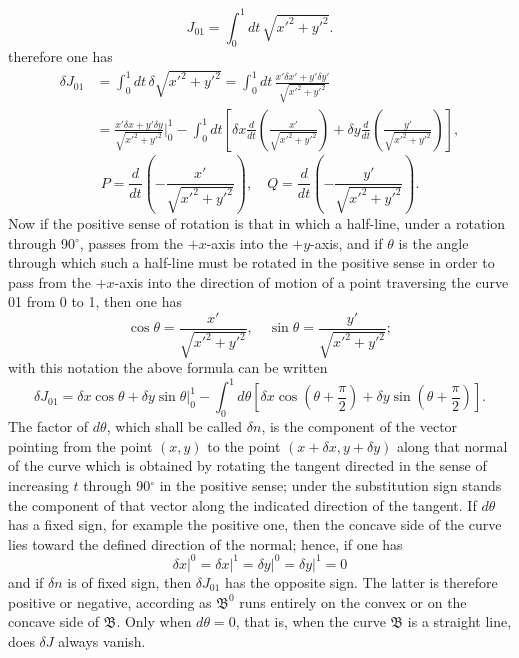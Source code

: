 \documentclass[11pt,a4paper,leqno]{article}
\begin{document}
\[
J_{01}=\int_0^1dt\,\sqrt{x'^2+y'^2}.
\]
therefore one has
\[
\begin{aligned}
\delta J_{01}
&=\int_0^1dt\,\delta\sqrt{x'^2+y'^2}
 =\int_0^1dt\,\frac{x'\delta x'+y'\delta y'}{\sqrt{x'^2+y'^2}}\\
&=\frac{x'\delta x+y'\delta y}{\sqrt{x'^2+y'^2}}\bigg|_0^1
-\int_0^1dt\left[\delta x\frac{d}{dt}\left(\frac{x'}{\sqrt{x'^2+y'^2}}\right)+\delta y\frac{d}{dt}\left(\frac{y'}{\sqrt{x'^2+y'^2}}\right)\right],
\end{aligned}
\]
\[
P=\frac{d}{dt}\left(-\frac{x'}{\sqrt{x'^2+y'^2}}\right),\quad
Q=\frac{d}{dt}\left(-\frac{y'}{\sqrt{x'^2+y'^2}}\right).
\]
Now if the positive sense of rotation is that in which a half-line, under a rotation through 90\(^{\circ}\), passes from the \(+x\)-axis into the \(+y\)-axis, and if \(\theta\) is the angle through which such a half-line must be rotated in the positive sense in order to pass from the \(+x\)-axis into the direction of motion of a point traversing the curve 01 from 0 to 1, then one has
\[
\cos\theta=\frac{x'}{\sqrt{x'^2+y'^2}},\quad \sin\theta=\frac{y'}{\sqrt{x'^2+y'^2}};
\]
with this notation the above formula can be written
\[
\delta J_{01}=\delta x\cos\theta+\delta y\sin\theta\bigg|_0^1
-\int_0^1d\theta\left[\delta x\cos\left(\theta+\frac{\pi}{2}\right)+\delta y\sin\left(\theta+\frac{\pi}{2}\right)\right].
\]
The factor of \(d\theta\), which shall be called \(\delta n\), is the component of the vector pointing from the point \((x,y)\) to the point \((x+\delta x,y+\delta y)\) along that normal of the curve which is obtained by rotating the tangent directed in the sense of increasing \(t\) through 90\(^{\circ}\) in the positive sense; under the substitution sign stands the component of that vector along the indicated direction of the tangent. If \(d\theta\) has a fixed sign, for example the positive one, then the concave side of the curve lies toward the defined direction of the normal; hence, if one has
\[
\delta x\big|^0=\delta x\big|^1=\delta y\big|^0=\delta y\big|^1=0
\]
and if \(\delta n\) is of fixed sign, then \(\delta J_{01}\) has the opposite sign. The latter is therefore positive or negative,
according as \(\mathfrak B^0\) runs entirely on the convex or on the concave side of \(\mathfrak B\). Only when \(d\theta=0\), that is, when the curve \(\mathfrak B\) is a straight line, does \(\delta J\) always vanish.
\end{document}
